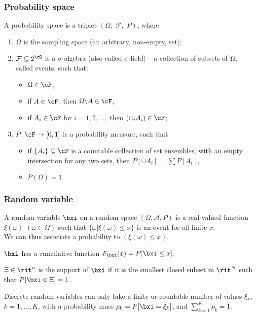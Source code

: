
\begin{frame}
\frametitle{Probability space}

A probability space is a triplet $(\Omega,\; \mathcal{F},\; P)$, where
\begin{enumerate}
\item
$\Omega$ is the sampling space (an arbitrary, non-empty, set);
\item
$\mathcal{F} \subseteq 2^{\cQ}$ is a $\sigma$-algebra (also called $\sigma$-field) -- a collection of subsets of $\Omega$, called events, such that:
\begin{itemize}
	\item
	$\Omega \in \cF$,
	\item
	if $A \in \cF$, then $\Omega \backslash A \in \cF$,
	\item
	if $A_i \in \cF$ for $i=1,2,\ldots,$ then $(\cup_i A_i) \in \cF$;
\end{itemize}
\item
$P$: $\cF \rightarrow [0,1]$ is a probability measure, such that
\begin{itemize}
	\item
	if $\{A_i\} \subseteq \cF$ is a countable collection of set ensembles, with an empty intersection for any two sets, then $P[ \cup A_i ] = \sum P[A_i]$,
	\item
	$P(\Omega) = 1$.
\end{itemize}
\end{enumerate}

\end{frame}

\begin{frame}
\frametitle{Random variable}

A {\red random variable} $\bxi$ on a random space $(\Omega,	\mathcal{A}, P)$ is a real-valued function $\xi(\omega)$ $(\omega \in \Omega)$ such that $\lbrace \omega | \xi(\omega) \leq x \rbrace$ is an event for all finite $x$.\\
We can thus associate a probability to $(\xi(\omega) \leq x)$.

\mbox{}

$\bxi$ has a {\red cumulative function} $F_{\bxi}(x) = P[\bxi \leq x]$.

\mbox{}

$\Xi \in \rit^n$ is the {\red support} of $\bxi$ if it is the smallest closed subset in $\rit^N$ such that $P[\bxi \in \Xi] = 1$.

\mbox{}

{\red Discrete random variables} can only take a finite or countable number of values $\xi_k$, $k = 1,\ldots, K$, with a {\red probability mass} $p_k = P[\bxi = \xi_k]$, and $\sum_{k=1}^K p_k = 1$.

\end{frame}

